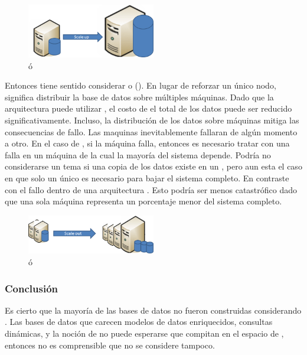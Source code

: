 \begin{figure}[h!]
	\centering
	\includegraphics[width=0.5\textwidth]{figuras/cap2/scale_up.png}
	\caption{\verticalScalingDB ó \scalingUpDB }
	\label{figure:figure_scale_up}
\end{figure}

Entonces tiene sentido  considerar \horizontalScalingDB o \scalingOutDB(). En lugar de reforzar un único nodo, \horizontalScalingDB significa distribuir la base de datos sobre múltiples máquinas. Dado que la arquitectura \horizontallyScaledDB puede utilizar \commodityHardwarePC, el costo de \hostingDB el total de los datos puede ser reducido significativamente. Incluso, la distribución  de los datos sobre máquinas mitiga las consecuencias de fallo. Las maquinas inevitablemente fallaran de algún momento a otro. En el caso de \verticalScalingDB , si la máquina falla, entonces es necesario tratar con una falla en un máquina de la cual la mayoría del sistema depende. Podría no considerarse un tema si una copia de los datos existe en un \replicatedSlaveDB, pero aun esta el caso en que solo un único \serverAS es necesario para bajar el sistema completo. En contraste con el fallo dentro de una arquitectura \horizontallyScaledDB. Esto podría ser menos catastrófico dado que una sola máquina representa un porcentaje menor del sistema completo.

\begin{figure}[h!]
	\centering
	\includegraphics[width=0.5\textwidth]{figuras/cap2/scale_out.png}
	\caption{\horizontalScalingDB ó \scalingOutDB }
	\label{figure:figure_scale_out}
\end{figure}

\subsubsection{Conclusión}

Es cierto que la mayoría de las bases de datos \nosqlNAME no fueron construidas considerando \ecommerce. Las bases de datos que carecen modelos de datos enriquecidos, consultas dinámicas, y la noción de \transactionalityDB no puede esperarse que compitan en el espacio de \ecommerce, entonces no es comprensible que no se considere \mongodbNAME tampoco.

